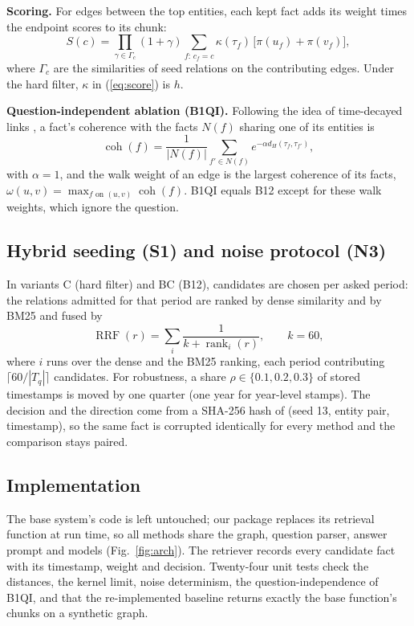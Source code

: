 \textbf{Scoring.} For edges between the top entities, each kept fact adds its weight times the endpoint scores to its chunk:
\begin{equation}
  S(c) = \prod_{\gamma \in \Gamma_c} (1 + \gamma) \sum_{f:\, c_f = c} \kappa(\tau_f)\,\big[\pi(u_f) + \pi(v_f)\big],
  \label{eq:score}
\end{equation}
where $\Gamma_c$ are the similarities of seed relations on the contributing edges. Under the hard filter, $\kappa$ in (\ref{eq:score}) is $h$.

\textbf{Question-independent ablation (B1QI).} Following the idea of time-decayed links \cite{sun2025dygrag}, a fact's coherence with the facts $N(f)$ sharing one of its entities is
\begin{equation}
  \operatorname{coh}(f) = \frac{1}{|N(f)|} \sum_{f' \in N(f)} e^{-\alpha d_H(\tau_f, \tau_{f'})},
  \label{eq:coh}
\end{equation}
with $\alpha = 1$, and the walk weight of an edge is the largest coherence of its facts, $\omega(u, v) = \max_{f \text{ on } (u,v)} \operatorname{coh}(f)$. B1QI equals B12 except for these walk weights, which ignore the question.

\subsection{Hybrid seeding (S1) and noise protocol (N3)}
In variants C (hard filter) and BC (B12), candidates are chosen per asked period: the relations admitted for that period are ranked by dense similarity and by BM25 and fused by
\begin{equation}
  \operatorname{RRF}(r) = \sum_{i} \frac{1}{k + \operatorname{rank}_i(r)}, \qquad k = 60,
  \label{eq:rrf}
\end{equation}
where $i$ runs over the dense and the BM25 ranking, each period contributing $\lceil 60/|T_q| \rceil$ candidates. For robustness, a share $\rho \in \{0.1, 0.2, 0.3\}$ of stored timestamps is moved by one quarter (one year for year-level stamps). The decision and the direction come from a SHA-256 hash of (seed 13, entity pair, timestamp), so the same fact is corrupted identically for every method and the comparison stays paired.

\subsection{Implementation}
The base system's code is left untouched; our package replaces its retrieval function at run time, so all methods share the graph, question parser, answer prompt and models (Fig.~\ref{fig:arch}). The retriever records every candidate fact with its timestamp, weight and decision. Twenty-four unit tests check the distances, the kernel limit, noise determinism, the question-independence of B1QI, and that the re-implemented baseline returns exactly the base function's chunks on a synthetic graph.
